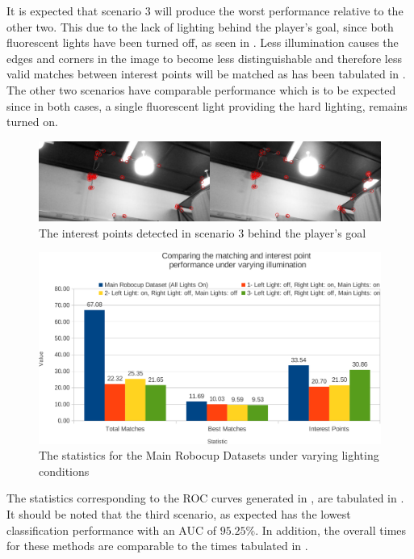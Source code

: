 It is expected that scenario $3$ will produce the worst performance relative to the other two. This due to the lack of lighting behind the player's goal, since both fluorescent lights have been turned off, as seen in . Less illumination causes the edges and corners in the image to become less distinguishable and therefore less valid matches between interest points will be matched as has been tabulated in . The other two scenarios have comparable performance which is to be expected since in both cases, a single fluorescent light providing the hard lighting, remains turned on.\\

\begin{figure}[h!] 
  \centering
    \includegraphics[width=1.0\textwidth]{../Drawings/Matching/dataset_lighting_incorrect_matches.jpg}
    \caption{The interest points detected in scenario $3$ behind the player's goal}
    \label{fig:lighting_pg}
\end{figure}

\begin{figure}[h!] 
  \centering
    \includegraphics[width=1.0\textwidth]{../Drawings/Graphs/varyingLight_matches_keypoints_best.pdf}
    \caption{The statistics for the Main Robocup Datasets under varying lighting conditions}
    \label{fig:varyingLighting_matches_keypoints}
\end{figure}


The statistics corresponding to the ROC curves generated in ,  are tabulated in . It should be noted that the third scenario, as expected has the lowest classification performance with an AUC of $95.25\%$. In addition, the overall times for these methods are comparable to the times tabulated in .\\



